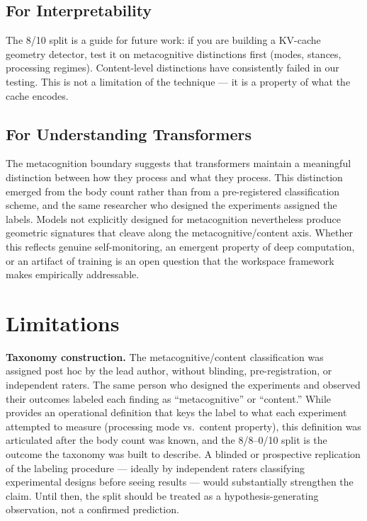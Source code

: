 \documentclass[11pt,a4paper]{article}
\begin{document}
\subsection{For Interpretability}

The 8/10 split is a guide for future work: if you are building a
KV-cache geometry detector, test it on metacognitive distinctions
first (modes, stances, processing regimes). Content-level distinctions
have consistently failed in our testing. This is not a limitation of the technique --- it is a
property of what the cache encodes.

\subsection{For Understanding Transformers}

The metacognition boundary suggests that transformers maintain a
meaningful distinction between how they process and what they process.
This distinction emerged from the body count rather than from a
pre-registered classification scheme, and the same researcher who
designed the experiments assigned the labels. Models not explicitly
designed for metacognition nevertheless produce geometric signatures
that cleave along the metacognitive/content axis. Whether this reflects
genuine self-monitoring, an emergent property of deep computation, or
an artifact of training is an open question that the workspace
framework makes empirically addressable.

\section{Limitations}
\label{sec:limitations}

\textbf{Taxonomy construction.}
The metacognitive/content classification was assigned post hoc by the
lead author, without blinding, pre-registration, or independent raters.
The same person who designed the experiments and observed their outcomes
labeled each finding as ``metacognitive'' or ``content.'' While
 provides an operational definition that keys the label
to what each experiment attempted to measure (processing mode vs.\
content property), this definition was articulated after the body count
was known, and the 8/8--0/10 split is the outcome the taxonomy was built
to describe. A blinded or prospective replication of the labeling
procedure --- ideally by independent raters classifying experimental
designs before seeing results --- would substantially strengthen the
claim. Until then, the split should be treated as a hypothesis-generating
observation, not a confirmed prediction.
\end{document}
